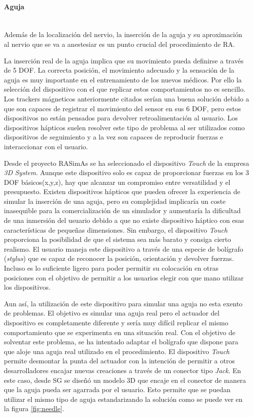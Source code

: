 \paragraph{Aguja}\mbox{}\\

Además de la localización del nervio, la inserción de la aguja y su aproximación al nervio que se va a anestesiar es un punto crucial del procedimiento de \ac{RA}. 

La inserción real de la aguja implica que su movimiento pueda definirse a través de 5 \ac{DOF}. La correcta posición, el movimiento adecuado y la sensación de la aguja es muy importante en el entrenamiento de los nuevos médicos. Por ello la selección del dispositivo con el que replicar estos comportamientos no es sencillo. Los \ac{tracker}s mágneticos anteriormente citados serían una buena solución debido a que son capaces de registrar el movimiento del sensor en sus 6 \ac{DOF}, pero estos dispositivos no están pensados para devolver retroalimentación al usuario. Los dispositivos hápticos suelen resolver este tipo de problema al ser utilizados como dispositivos de seguimiento y a la vez son capaces de reproducir fuerzas e interaccionar con el usuario.

Desde el proyecto \ac{RASimAs} se ha seleccionado el dispositivo \emph{Touch} de la empresa \emph{3D System}\cite{asdf}. Aunque este dispositivo solo es capaz de proporcionar fuerzas en los 3 \ac{DOF} básicos(x,y,z), hay que alcanzar un compromiso entre versatilidad y el presupuesto. Existen dispositivos hápticos que pueden ofrecer la experiencia de simular la inserción de una aguja, pero su complejidad implicaría un coste inasequible para la comercialización de un simulador y aumentaría la dificultad de una inmersión del usuario debido a que no existe dispositivo háptico con esas características de pequeñas dimensiones. Sin embargo, el dispositivo \emph{Touch} proporciona la posibilidad de que el sistema sea más barato y consiga cierto realismo. 
El usuario maneja este dispositivo a través de una especie de bolígrafo (\emph{stylus}) que es capaz de reconocer la posición, orientación y devolver fuerzas. Incluso es lo suficiente ligero para poder permitir su colocación en otras posiciones con el objetivo de permitir a los usuarios elegir con que mano utilizar los dispositivos.

Aun así, la utilización de este dispositivo para simular una aguja no esta exento de problemas. El objetivo es simular una aguja real pero el actuador del dispositivo es completamente diferente y sería muy difícil replicar el mismo comportamiento que se experimenta en una situación real.
Con el objetivo de solventar este problema, se ha intentado adaptar el bolígrafo que dispone para que aloje una aguja real utilizado en el procedimiento.
El dispositivo \emph{Touch} permite desmontar la punta del actuador con la intención de permitir a otros desarrolladores encajar nuevas creaciones a través de un conector tipo \emph{Jack}. En este caso, desde \ac{SG} se diseñó un modelo 3D que encaje en el conector de manera que la aguja pueda ser agarrada por el usuario. Esto permite que se puedan utilizar el mismo tipo de aguja estandarizando la solución como se puede ver en la figura \ref{fig:needle}.

